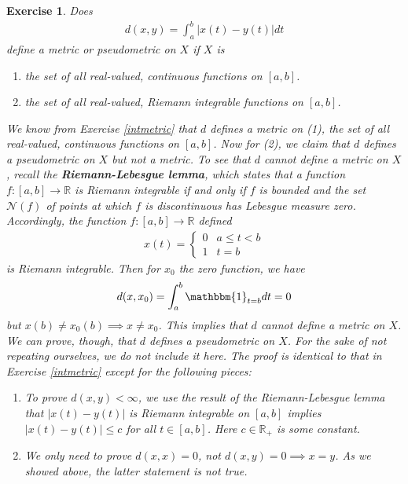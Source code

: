 \documentclass[11pt]{article}
\theoremstyle{mystyle}
\newtheorem{protoexer}{Exercise}[section]
\newenvironment{exer}
{\colorlet{shadecolor}{blue!15}\begin{shaded}\begin{protoexer}}
{\end{protoexer}\end{shaded}}
\newcommand{\0}{\mathbf{0}}
\begin{document}
\begin{exer}
Does
\begin{align*}
    d(x, y) = \int_a^b |x(t) - y(t)|dt
\end{align*}
define a metric or pseudometric on $X$ if $X$ is 
\begin{enumerate}
    \item the set of all real-valued, continuous functions on $[a,b]$.
    \item the set of all real-valued, Riemann integrable functions on $[a,b]$.
\end{enumerate}
We know from Exercise \ref{intmetric} that $d$ defines a metric on (1), the set of all real-valued, continuous functions on $[a,b]$. Now for (2), we claim that $d$ defines a pseudometric on $X$ but not a metric.\newline
To see that $d$ cannot define a metric on $X$, recall the \textbf{Riemann-Lebesgue lemma}, which states that a function $f: [a,b] \longrightarrow \mathbb{R}$ is Riemann integrable if and only if $f$ is bounded and the set $\mathcal{N}(f)$ of points at which $f$ is discontinuous has Lebesgue measure zero. Accordingly, the function $f: [a, b] \longrightarrow \mathbb{R}$ defined
\begin{align*}
    x(t) = \begin{cases}
    0 & a \leq t < b\\
    1 & t = b
    \end{cases}
\end{align*}
is Riemann integrable. Then for $x_0$ the zero function, we have 
\begin{align*}
    d(x, x_0) = \int_a^b \mathbbm{1}_{t = b} dt = 0
\end{align*}
but $x(b) \neq x_0(b) \implies x \neq x_0$. This implies that $d$ cannot define a metric on $X$.\newline
We can prove, though, that $d$ defines a pseudometric on $X$. For the sake of not repeating ourselves, we do not include it here. The proof is identical to that in Exercise \ref{intmetric} except for the following pieces:
\begin{enumerate}
    \item To prove $d(x, y) < \infty$, we use the result of the Riemann-Lebesgue lemma that $|x(t) - y(t)|$ is Riemann integrable on $[a,b]$ implies $|x(t) - y(t)| \leq c$ for all $t \in [a, b]$. Here $c \in \mathbb{R}_+$ is some constant.
    \item We only need to prove $d(x, x) = 0$, not $d(x, y) = 0 \implies x = y$. As we showed above, the latter statement is not true.
\end{enumerate}
\end{exer}
\end{document}
